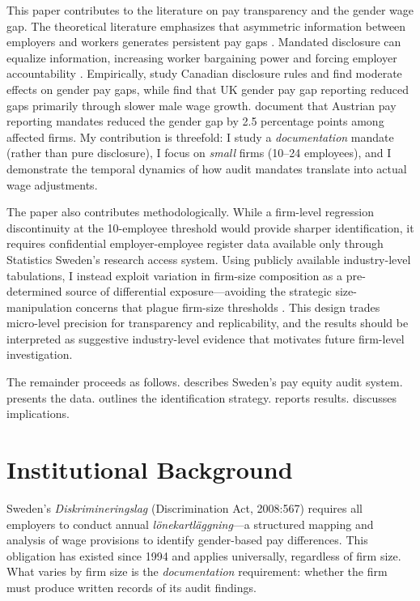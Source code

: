 \documentclass[12pt]{article}
\begin{document}
This paper contributes to the literature on pay transparency and the gender wage gap. The theoretical literature emphasizes that asymmetric information between employers and workers generates persistent pay gaps \citep{card2016bargaining,caldwell2023outside}. Mandated disclosure can equalize information, increasing worker bargaining power \citep{cullen2024equilibrium} and forcing employer accountability \citep{obloj2023making}. Empirically, \citet{baker2023pay} study Canadian disclosure rules and find moderate effects on gender pay gaps, while \citet{duchini2020pay} find that UK gender pay gap reporting reduced gaps primarily through slower male wage growth. \citet{gulyas2023does} document that Austrian pay reporting mandates reduced the gender gap by 2.5 percentage points among affected firms. My contribution is threefold: I study a \textit{documentation} mandate (rather than pure disclosure), I focus on \textit{small} firms (10--24 employees), and I demonstrate the temporal dynamics of how audit mandates translate into actual wage adjustments.

The paper also contributes methodologically. While a firm-level regression discontinuity at the 10-employee threshold would provide sharper identification, it requires confidential employer-employee register data available only through Statistics Sweden's research access system. Using publicly available industry-level tabulations, I instead exploit variation in firm-size composition as a pre-determined source of differential exposure---avoiding the strategic size-manipulation concerns that plague firm-size thresholds \citep{garicano2016firm}. This design trades micro-level precision for transparency and replicability, and the results should be interpreted as suggestive industry-level evidence that motivates future firm-level investigation.

The remainder proceeds as follows.  describes Sweden's pay equity audit system.  presents the data.  outlines the identification strategy.  reports results.  discusses implications.

\section{Institutional Background}
\label{sec:background}

Sweden's \textit{Diskrimineringslag} (Discrimination Act, 2008:567) requires all employers to conduct annual \textit{l\"{o}nekartl\"{a}ggning}---a structured mapping and analysis of wage provisions to identify gender-based pay differences. This obligation has existed since 1994 and applies universally, regardless of firm size. What varies by firm size is the \textit{documentation} requirement: whether the firm must produce written records of its audit findings.
\end{document}

